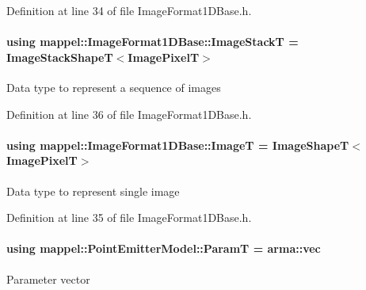 Definition at line 34 of file Image\+Format1\+D\+Base.\+h.

\paragraph[{\texorpdfstring{Image\+StackT}{ImageStackT}}]{\setlength{\rightskip}{0pt plus 5cm}using {\bf mappel\+::\+Image\+Format1\+D\+Base\+::\+Image\+StackT} =  {\bf Image\+Stack\+ShapeT}$<${\bf Image\+PixelT}$>$\hspace{0.3cm}{\ttfamily [inherited]}}\hypertarget{classmappel_1_1ImageFormat1DBase_a81e3246d1c5c37ebf9077b7b5bd25a76}{}\label{classmappel_1_1ImageFormat1DBase_a81e3246d1c5c37ebf9077b7b5bd25a76}
Data type to represent a sequence of images 

Definition at line 36 of file Image\+Format1\+D\+Base.\+h.

\paragraph[{\texorpdfstring{ImageT}{ImageT}}]{\setlength{\rightskip}{0pt plus 5cm}using {\bf mappel\+::\+Image\+Format1\+D\+Base\+::\+ImageT} =  {\bf Image\+ShapeT}$<${\bf Image\+PixelT}$>$\hspace{0.3cm}{\ttfamily [inherited]}}\hypertarget{classmappel_1_1ImageFormat1DBase_a521a1ff391a52a636fac4aac7c7ba02c}{}\label{classmappel_1_1ImageFormat1DBase_a521a1ff391a52a636fac4aac7c7ba02c}
Data type to represent single image 

Definition at line 35 of file Image\+Format1\+D\+Base.\+h.

\paragraph[{\texorpdfstring{ParamT}{ParamT}}]{\setlength{\rightskip}{0pt plus 5cm}using {\bf mappel\+::\+Point\+Emitter\+Model\+::\+ParamT} =  arma\+::vec\hspace{0.3cm}{\ttfamily [inherited]}}\hypertarget{classmappel_1_1PointEmitterModel_a665ec6aea3aac139bb69a23c06d4b9a1}{}\label{classmappel_1_1PointEmitterModel_a665ec6aea3aac139bb69a23c06d4b9a1}
Parameter vector 

